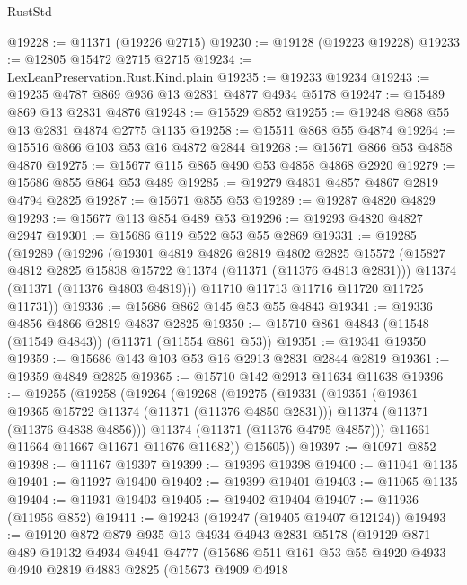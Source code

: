 \begin{lexlean}{RustStd}
\begin{coremodule}
@19228 := @11371 (@19226 @2715)
@19230 := @19128 (@19223 @19228)
@19233 := @12805 @15472 @2715 @2715
@19234 := LexLeanPreservation.Rust.Kind.plain
@19235 := @19233 @19234
@19243 := @19235 @4787 @869 @936 @13 @2831 @4877 @4934 @5178
@19247 := @15489 @869 @13 @2831 @4876
@19248 := @15529 @852
@19255 := @19248 @868 @55 @13 @2831 @4874 @2775 @1135
@19258 := @15511 @868 @55 @4874
@19264 := @15516 @866 @103 @53 @16 @4872 @2844
@19268 := @15671 @866 @53 @4858 @4870
@19275 := @15677 @115 @865 @490 @53 @4858 @4868 @2920
@19279 := @15686 @855 @864 @53 @489
@19285 := @19279 @4831 @4857 @4867 @2819 @4794 @2825
@19287 := @15671 @855 @53
@19289 := @19287 @4820 @4829
@19293 := @15677 @113 @854 @489 @53
@19296 := @19293 @4820 @4827 @2947
@19301 := @15686 @119 @522 @53 @55 @2869
@19331 := @19285
    (@19289
      (@19296
        (@19301
          @4819
          @4826
          @2819
          @4802
          @2825
          @15572
          (@15827 @4812 @2825 @15838 @15722 @11374 (@11371 (@11376 @4813 @2831)))
          @11374
          (@11371 (@11376 @4803 @4819)))
        @11710
        @11713
        @11716
        @11720
        @11725
        @11731))
@19336 := @15686 @862 @145 @53 @55 @4843
@19341 := @19336 @4856 @4866 @2819 @4837 @2825
@19350 := @15710 @861 @4843 (@11548 (@11549 @4843)) (@11371 (@11554 @861 @53))
@19351 := @19341 @19350
@19359 := @15686 @143 @103 @53 @16 @2913 @2831 @2844 @2819
@19361 := @19359 @4849 @2825
@19365 := @15710 @142 @2913 @11634 @11638
@19396 := @19255
    (@19258
      (@19264
        (@19268
          (@19275
            (@19331
              (@19351
                (@19361 @19365 @15722 @11374 (@11371 (@11376 @4850 @2831)))
                @11374
                (@11371 (@11376 @4838 @4856)))
              @11374
              (@11371 (@11376 @4795 @4857)))
            @11661
            @11664
            @11667
            @11671
            @11676
            @11682))
        @15605))
@19397 := @10971 @852
@19398 := @11167 @19397
@19399 := @19396 @19398
@19400 := @11041 @1135
@19401 := @11927 @19400
@19402 := @19399 @19401
@19403 := @11065 @1135
@19404 := @11931 @19403
@19405 := @19402 @19404
@19407 := @11936 (@11956 @852)
@19411 := @19243 (@19247 (@19405 @19407 @12124))
@19493 := @19120
    @872
    @879
    @935
    @13
    @4934
    @4943
    @2831
    @5178
    (@19129
      @871
      @489
      @19132
      @4934
      @4941
      @4777
      (@15686
        @511
        @161
        @53
        @55
        @4920
        @4933
        @4940
        @2819
        @4883
        @2825
        (@15673
          @4909
          @4918

\end{coremodule}
\end{lexlean}
